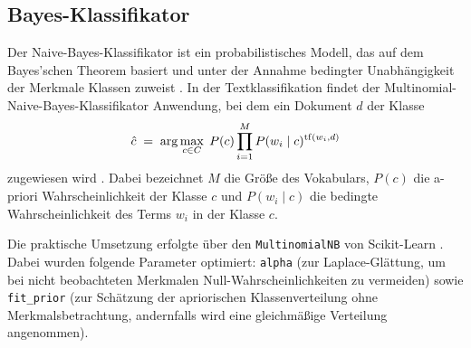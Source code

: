 \subsection{Bayes-Klassifikator}
\label{sec:bayes-klassifikator}

Der Naive-Bayes-Klassifikator ist ein probabilistisches Modell, das auf dem Bayes’schen Theorem basiert und unter der Annahme bedingter Unabhängigkeit der Merkmale Klassen zuweist \cite{Bishop2019}. In der Textklassifikation findet der Multinomial-Naive-Bayes-Klassifikator Anwendung, bei dem ein Dokument $d$ der Klasse
\begin{equation*}
    \hat{c} \;=\; \arg\max_{c \in C}\; P(c) \prod_{i=1}^{M} P(w_i \mid c)^{\operatorname{tf}(w_i,d)}
\end{equation*}
zugewiesen wird \cite{Manning2009}. Dabei bezeichnet $M$ die Größe des Vokabulars, $P(c)$ die a-priori Wahrscheinlichkeit der Klasse $c$ und $P(w_i \mid c)$ die bedingte Wahrscheinlichkeit des Terms $w_i$ in der Klasse $c$.

Die praktische Umsetzung erfolgte über den \texttt{MultinomialNB} von Scikit-Learn \cite{Pedregosa2011}. Dabei wurden folgende Parameter optimiert: \texttt{alpha} (zur Laplace-Glättung, um bei nicht beobachteten Merkmalen Null-Wahrscheinlichkeiten zu vermeiden) sowie \texttt{fit\_prior} (zur Schätzung der apriorischen Klassenverteilung ohne Merkmalsbetrachtung, andernfalls wird eine gleichmäßige Verteilung angenommen).
